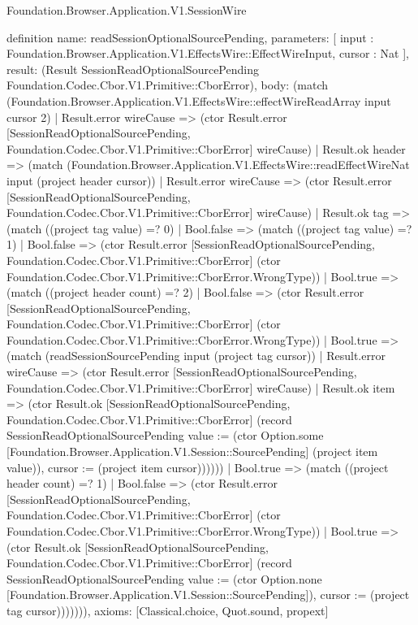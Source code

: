 \begin{lexlean}{Foundation.Browser.Application.V1.SessionWire}
\begin{semanticmodule}
definition{
  name: readSessionOptionalSourcePending,
  parameters: [
    input : Foundation.Browser.Application.V1.EffectsWire::EffectWireInput,
    cursor : Nat
  ],
  result: (Result SessionReadOptionalSourcePending Foundation.Codec.Cbor.V1.Primitive::CborError),
  body: (match (Foundation.Browser.Application.V1.EffectsWire::effectWireReadArray input cursor 2)
    | Result.error wireCause => (ctor Result.error [SessionReadOptionalSourcePending, Foundation.Codec.Cbor.V1.Primitive::CborError] wireCause)
    | Result.ok header => (match (Foundation.Browser.Application.V1.EffectsWire::readEffectWireNat input (project header cursor))
      | Result.error wireCause => (ctor Result.error [SessionReadOptionalSourcePending, Foundation.Codec.Cbor.V1.Primitive::CborError] wireCause)
      | Result.ok tag => (match ((project tag value) =? 0)
        | Bool.false => (match ((project tag value) =? 1)
          | Bool.false => (ctor Result.error [SessionReadOptionalSourcePending, Foundation.Codec.Cbor.V1.Primitive::CborError] (ctor Foundation.Codec.Cbor.V1.Primitive::CborError.WrongType))
          | Bool.true => (match ((project header count) =? 2)
            | Bool.false => (ctor Result.error [SessionReadOptionalSourcePending, Foundation.Codec.Cbor.V1.Primitive::CborError] (ctor Foundation.Codec.Cbor.V1.Primitive::CborError.WrongType))
            | Bool.true => (match (readSessionSourcePending input (project tag cursor))
              | Result.error wireCause => (ctor Result.error [SessionReadOptionalSourcePending, Foundation.Codec.Cbor.V1.Primitive::CborError] wireCause)
              | Result.ok item => (ctor Result.ok [SessionReadOptionalSourcePending, Foundation.Codec.Cbor.V1.Primitive::CborError] (record SessionReadOptionalSourcePending {value := (ctor Option.some [Foundation.Browser.Application.V1.Session::SourcePending] (project item value)), cursor := (project item cursor)})))))
        | Bool.true => (match ((project header count) =? 1)
          | Bool.false => (ctor Result.error [SessionReadOptionalSourcePending, Foundation.Codec.Cbor.V1.Primitive::CborError] (ctor Foundation.Codec.Cbor.V1.Primitive::CborError.WrongType))
          | Bool.true => (ctor Result.ok [SessionReadOptionalSourcePending, Foundation.Codec.Cbor.V1.Primitive::CborError] (record SessionReadOptionalSourcePending {value := (ctor Option.none [Foundation.Browser.Application.V1.Session::SourcePending]), cursor := (project tag cursor)})))))),
  axioms: [Classical.choice, Quot.sound, propext]
}


\end{semanticmodule}
\end{lexlean}
